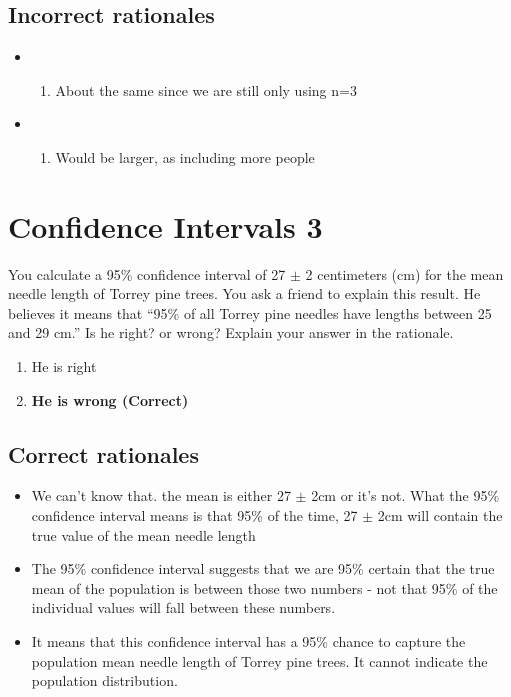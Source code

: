 \documentclass[letterpaper,9pt,twoside,printwatermark=false]{pinp}
\providecommand{\tightlist}{%
  \setlength{\itemsep}{0pt}\setlength{\parskip}{0pt}}
\begin{document}
\subsection{Incorrect rationales}\label{incorrect-rationales-3}

\begin{itemize}
\item
  \begin{enumerate}
  \def\labelenumi{\roman{enumi})}
  \setcounter{enumi}{1}
  \tightlist
  \item
    About the same since we are still only using n=3
  \end{enumerate}
\item
  \begin{enumerate}
  \def\labelenumi{\roman{enumi})}
  \setcounter{enumi}{1}
  \tightlist
  \item
    Would be larger, as including more people
  \end{enumerate}
\end{itemize}

\section{Confidence Intervals 3}\label{confidence-intervals-3}

You calculate a 95\% confidence interval of 27 \(\pm\) 2 centimeters
(cm) for the mean needle length of Torrey pine trees. You ask a friend
to explain this result. He believes it means that ``95\% of all Torrey
pine needles have lengths between 25 and 29 cm.'' Is he right? or wrong?
Explain your answer in the rationale.

\begin{enumerate}
\def\labelenumi{\alph{enumi}.}
\tightlist
\item
  He is right
\item
  \textbf{He is wrong (Correct)}
\end{enumerate}

\subsection{Correct rationales}\label{correct-rationales-4}

\begin{itemize}
\tightlist
\item
  We can't know that. the mean is either 27 \(\pm\) 2cm or it's not.
  What the 95\% confidence interval means is that 95\% of the time, 27
  \(\pm\) 2cm will contain the true value of the mean needle length
\item
  The 95\% confidence interval suggests that we are 95\% certain that
  the true mean of the population is between those two numbers - not
  that 95\% of the individual values will fall between these numbers.
\item
  It means that this confidence interval has a 95\% chance to capture
  the population mean needle length of Torrey pine trees. It cannot
  indicate the population distribution.
\end{itemize}
\end{document}
